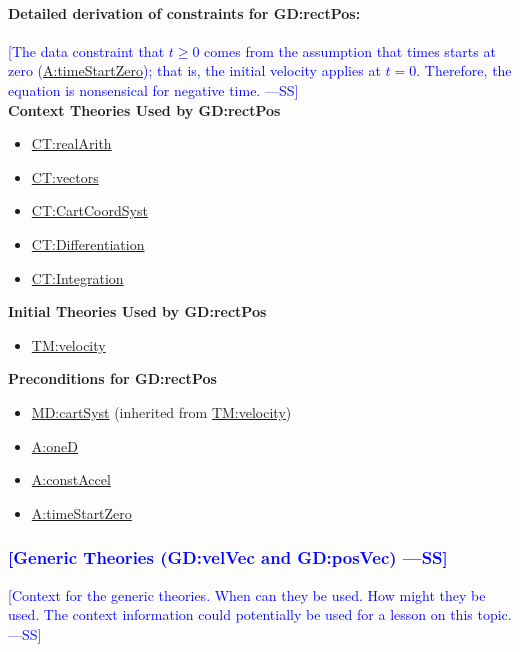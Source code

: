 \documentclass[12pt]{article}
\newcommand{\authornote}[3]{\textcolor{#1}{[#3 ---#2]}}
\newcommand{\authornote}[3]{}
\newcommand{\wss}[1]{\authornote{blue}{SS}{#1}}
\begin{document}
\paragraph{Detailed derivation of constraints for GD:rectPos:}

\wss{The data constraint that $t \geq 0$ comes from the assumption that times
starts at zero (\hyperref[timeStartZero]{A:timeStartZero}); that is, the initial
velocity applies at $t=0$.  Therefore, the equation is nonsensical for
negative time.}
~\\

\noindent \textbf{Context Theories Used by GD:rectPos}

\begin{itemize}
\item \hyperref[CT:realArith]{CT:realArith}
\item \hyperref[CT:vectors]{CT:vectors}
\item \hyperref[CT:CartCoordSyst]{CT:CartCoordSyst}
\item \hyperref[CT:Differentiation]{CT:Differentiation}
\item \hyperref[CT:Integration]{CT:Integration}
\end{itemize}

\noindent \textbf{Initial Theories Used by GD:rectPos}

\begin{itemize}
\item \hyperref[TM:velocity]{TM:velocity}
\end{itemize}

\noindent \textbf{Preconditions for GD:rectPos}

\begin{itemize}
\item \hyperref[MD:cartSyst]{MD:cartSyst} (inherited from \hyperref[TM:velocity]{TM:velocity})
\item \hyperref[oneD]{A:oneD}
\item \hyperref[constAccel]{A:constAccel}
\item \hyperref[timeStartZero]{A:timeStartZero}
\end{itemize}

\subsubsection{\wss{Generic Theories (GD:velVec and GD:posVec)}}

\wss{Context for the generic theories.  When can they be used.  How might they
be used.  The context information could potentially be used for a lesson on this
topic.}
\end{document}
